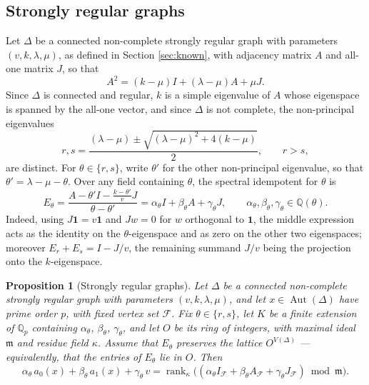 \documentclass[11pt]{article}
\theoremstyle{plain}
\newtheorem{proposition}[theorem]{Proposition}
\theoremstyle{remark}
\newcommand{\Aut}{\operatorname{Aut}}
\newcommand{\rank}{\operatorname{rank}}
\newcommand{\Qp}{\mathbb Q_p}
\newcommand{\one}{\mathbf 1}
\begin{document}
\subsection{Strongly regular graphs}\label{subsec:srg}

Let $\Delta$ be a connected non-complete strongly regular graph with parameters $(v,k,\lambda,\mu)$,
as defined in Section \ref{sec:known}, with adjacency matrix $A$ and all-one matrix $J$, so that
\[
 A^2=(k-\mu)I+(\lambda-\mu)A+\mu J.
\]
Since $\Delta$ is connected and regular,
$k$ is a simple eigenvalue of $A$ whose eigenspace is spanned by the all-one vector,
and since $\Delta$ is not complete, the non-principal eigenvalues
\[
 r,s=\frac{(\lambda-\mu)\pm\sqrt{(\lambda-\mu)^2+4(k-\mu)}}2,\qquad r>s,
\]
are distinct.
For $\theta\in\{r,s\}$, write $\theta'$ for the other non-principal eigenvalue, so that $\theta'=\lambda-\mu-\theta$.
Over any field containing $\theta$, the spectral idempotent for $\theta$ is
\begin{equation}\label{eq:Ers}
 E_\theta=\frac{A-\theta'I-\frac{k-\theta'}{v}J}{\theta-\theta'}
 =\alpha_\theta I+\beta_\theta A+\gamma_\theta J,
 \qquad\alpha_\theta,\beta_\theta,\gamma_\theta\in\mathbb Q(\theta).
\end{equation}
Indeed, using $J\one=v\one$ and $Jw=0$ for $w$ orthogonal to $\one$,
the middle expression acts as the identity on the $\theta$-eigenspace and as zero on the other two eigenspaces;
moreover $E_r+E_s=I-J/v$, the remaining summand $J/v$ being the projection onto the $k$-eigenspace.

\begin{proposition}[Strongly regular graphs]\label{prop:srg-rank}
Let $\Delta$ be a connected non-complete strongly regular graph with parameters $(v,k,\lambda,\mu)$,
and let $x\in\Aut(\Delta)$ have prime order $p$, with fixed vertex set $\mathcal F$.
Fix $\theta\in\{r,s\}$, let $K$ be a finite extension of $\Qp$ containing $\alpha_\theta$, $\beta_\theta$,
$\gamma_\theta$, and let $O$ be its ring of integers, with maximal ideal $\mathfrak m$ and residue field $\kappa$.
Assume that $E_\theta$ preserves the lattice $O^{V(\Delta)}$ --- equivalently, that the entries of $E_\theta$ lie in $O$.
Then
\[
 \alpha_\theta\, a_0(x)+\beta_\theta\, a_1(x)+\gamma_\theta\, v
 =\rank_{\kappa}\bigl((\alpha_\theta I_{\mathcal F}+\beta_\theta A_{\mathcal F}+\gamma_\theta J_{\mathcal F})\bmod \mathfrak m\bigr).
\]
\end{proposition}
\end{document}
